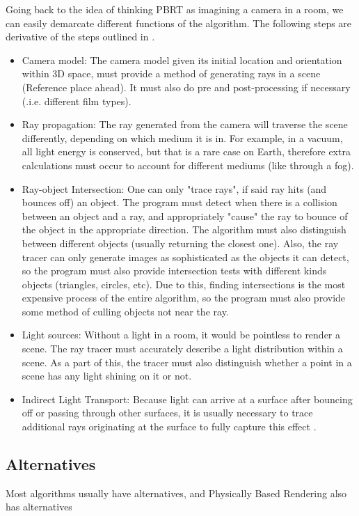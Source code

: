 \documentclass[../main.tex]{subfiles}
\begin{document}
Going back to the idea of thinking PBRT as imagining a camera in a room, we can easily demarcate different functions of the algorithm.
The following steps are derivative of the steps outlined in \cite{pharr_physically_2016}.
\begin{itemize}
  \item Camera model: The camera model given its initial location and orientation within 3D space, must provide a method of generating rays in a scene (Reference place ahead). It must also do pre and post-processing if necessary (.i.e. different film types).
  \item Ray propagation: The ray generated from the camera will traverse the scene differently, depending on which medium it is in. For example, in a vacuum, all light energy is conserved, but that is a rare case on Earth, therefore extra calculations must occur to account for different mediums (like through a fog).
  \item Ray-object Intersection: One can only "trace rays", if said ray hits (and bounces off) an object. The program must detect when there is a collision between an object and a ray, and appropriately "cause" the ray to bounce of the object in the appropriate direction.
    The algorithm must also distinguish between different objects (usually returning the closest one). Also, the ray tracer can only generate images as sophisticated as the objects it can detect, so the program must also provide intersection tests with different kinds objects (triangles, circles, etc). Due to this, finding intersections is the most expensive process of the entire algorithm, so the program must also provide some method of culling objects not near the ray.
  \item Light sources: Without a light in a room, it would be pointless to render a scene. The ray tracer must accurately describe a light distribution within a scene. As a part of this, the tracer must also distinguish whether a point in a scene has any light shining on it or not.
  \item Indirect Light Transport: Because light can arrive at a surface after bouncing off or passing through other surfaces, it is usually necessary to trace additional rays originating at the surface to fully capture this effect \cite{pharr_physically_2016}. 
\end{itemize}
\subsection{Alternatives}
Most algorithms usually have alternatives, and Physically Based Rendering also has alternatives
\end{document}
